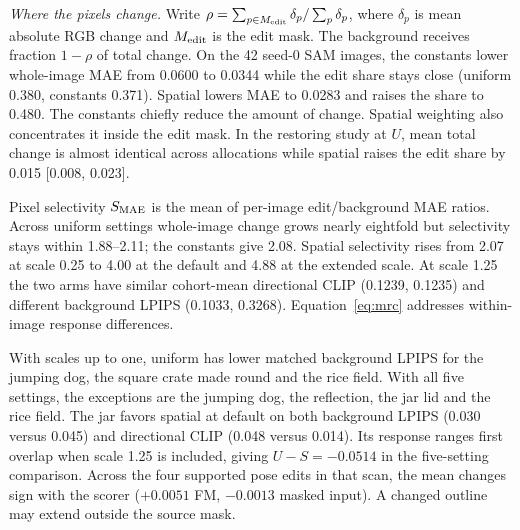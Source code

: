 \noindent\textit{Where the pixels change.} Write $\rho=\sum_{p\in M_{\rm edit}}\delta_p/\sum_p\delta_p$, where $\delta_p$ is mean absolute RGB change and $M_{\rm edit}$ is the edit mask. The background receives fraction $1-\rho$ of total change. On the 42 seed-0 SAM images, the constants lower whole-image MAE from 0.0600 to 0.0344 while the edit share stays close (uniform 0.380, constants 0.371). Spatial lowers MAE to 0.0283 and raises the share to 0.480. The constants chiefly reduce the amount of change. Spatial weighting also concentrates it inside the edit mask. In the restoring study at $U$, mean total change is almost identical across allocations while spatial raises the edit share by 0.015 [0.008, 0.023].

Pixel selectivity $S_{\rm MAE}$ is the mean of per-image edit/background MAE ratios. Across uniform settings whole-image change grows nearly eightfold but selectivity stays within 1.88--2.11; the constants give 2.08. Spatial selectivity rises from 2.07 at scale 0.25 to 4.00 at the default and 4.88 at the extended scale. At scale 1.25 the two arms have similar cohort-mean directional CLIP (0.1239, 0.1235) and different background LPIPS (0.1033, 0.3268). Equation~\eqref{eq:mrc} addresses within-image response differences.

With scales up to one, uniform has lower matched background LPIPS for the jumping dog, the square crate made round and the rice field. With all five settings, the exceptions are the jumping dog, the reflection, the jar lid and the rice field. The jar favors spatial at default on both background LPIPS (0.030 versus 0.045) and directional CLIP (0.048 versus 0.014). Its response ranges first overlap when scale 1.25 is included, giving $U-S=-0.0514$ in the five-setting comparison. Across the four supported pose edits in that scan, the mean changes sign with the scorer ($+0.0051$ FM, $-0.0013$ masked input). A changed outline may extend outside the source mask.
